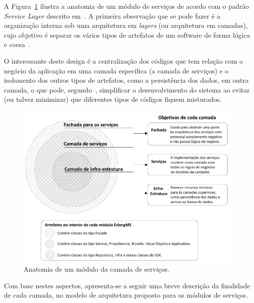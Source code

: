 A Figura~\ref{fig:arquitetura_modulo} ilustra
a anatomia de um módulo de serviços
de acordo com o padrão \textit{Service Layer}
descrito em~\cite{fowler2002patterns}.
A primeira observação que
se pode fazer é a 
organização interna sob uma arquitetura
em \textit{layers} (ou arquitetura em camadas),
cujo objetivo é separar os 
vários tipos de artefatos 
de um software de forma lógica e coesa~\cite{evans2004domain}.

O interessante deste design 
é a centralização dos códigos
que tem relação com o negócio da aplicação
em uma camada específica (a camada de serviços)
e o isolamento dos outros tipos
de artefatos, como a persistência dos dados, em outra camada,
o que pode, segundo~\cite{avram2007domain}, simplificar o desenvolvimento do sistema 
ao evitar (ou talvez minimizar) que diferentes tipos 
de códigos fiquem misturados.



\begin{figure}[htb]
\centering
\includegraphics[scale=0.9]{img/processo/arquitetura_modulo.pdf}
\caption{Anatomia de um módulo da camada de serviços.}
\label{fig:arquitetura_modulo}
\end{figure}


Com base nestes aspectos, apresenta-se a seguir uma 
breve descrição da finalidade de cada camada,
no modelo de arquitetura proposto para 
os módulos de serviços.

